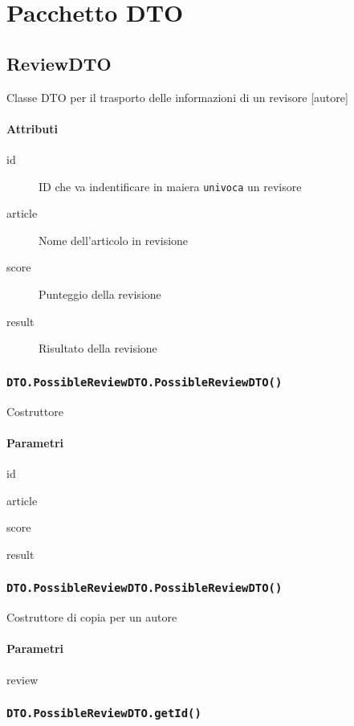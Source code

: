 \section{Pacchetto DTO}
\label{sec:package_dto}

\subsection{ReviewDTO}
Classe DTO per il trasporto delle informazioni di un revisore [autore]
\paragraph{Attributi}
\begin{description}
\item [id] ID che va indentificare in maiera \texttt{univoca} un revisore
\item [article] Nome dell'articolo in revisione
\item [score] Punteggio della revisione
\item [result] Risultato della revisione
\end{description}
\subsubsection{\texttt{DTO.PossibleReviewDTO.PossibleReviewDTO()}}
Costruttore
\paragraph{Parametri}
\begin{description}
\item id
\item article
\item score
\item result
\end{description}
\subsubsection{\texttt{DTO.PossibleReviewDTO.PossibleReviewDTO()}}
Costruttore di copia per un autore
\paragraph{Parametri}
\begin{description}
\item review
\end{description}
\subsubsection{\texttt{DTO.PossibleReviewDTO.getId()}}
